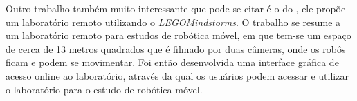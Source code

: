 Outro trabalho também muito interessante que pode-se citar é o do , ele propõe um laboratório remoto utilizando o \emph{LEGO\textregistered  Mindstorms}. O trabalho se resume  a um laboratório remoto para estudos de robótica móvel, em que tem-se um espaço de cerca de 13 metros quadrados que é filmado por duas câmeras, onde os robôs ficam e podem se movimentar. Foi então desenvolvida uma interface gráfica de acesso online ao laboratório, através da qual os usuários podem acessar e utilizar o laboratório para o estudo de robótica móvel. 

